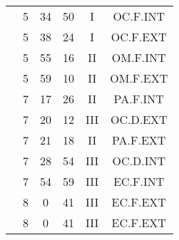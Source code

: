 \documentclass[12pt, a4paper]{article}
\begin{document}
\begin{multicols}{3}
{\begin{tabular}{c c c c c c}
	 	 	 	 & 5 & 34 & 50 & I & OC.F.INT\\%
	 	 	 	 & 5 & 38 & 24 & I & OC.F.EXT\\%
	 	 	 	 & 5 & 55 & 16 & II & OM.F.INT\\%
	 	 	 	 & 5 & 59 & 10 & II & OM.F.EXT\\%
	 	 	 	 & 7 & 17 & 26 & II & PA.F.INT\\%
	 	 	 	 & 7 & 20 & 12 & III & OC.D.EXT\\%
	 	 	 	 & 7 & 21 & 18 & II & PA.F.EXT\\%
	 	 	 	 & 7 & 28 & 54 & III & OC.D.INT\\%
	 	 	 	 & 7 & 54 & 59 & III & EC.F.INT\\%
	 	 	 	 & 8 & 0 & 41 & III & EC.F.EXT\\%
	 	 	 	 & 8 & 0 & 41 & III & EC.F.EXT\\%
	 	 \end{tabular}
 	}
\end{multicols}
\end{document}
